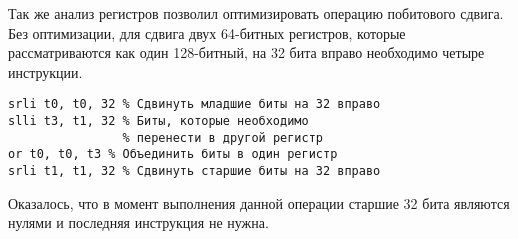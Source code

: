 Так же анализ регистров позволил оптимизировать операцию побитового сдвига.
Без оптимизации, для сдвига двух 64-битных регистров, которые рассматриваются как один 128-битный, на 32 бита вправо необходимо четыре инструкции.
\begin{lstlisting}[caption=Универсальный сдвиг на 32 вправо,
    frame=single,
    mathescape=false,
    keepspaces=true ]
srli t0, t0, 32 % Сдвинуть младшие биты на 32 вправо
slli t3, t1, 32 % Биты, которые необходимо 
                % перенести в другой регистр
or t0, t0, t3 % Объединить биты в один регистр
srli t1, t1, 32 % Сдвинуть старшие биты на 32 вправо
\end{lstlisting}
Оказалось, что в момент выполнения данной операции старшие 32 бита являются нулями и последняя инструкция не нужна.
